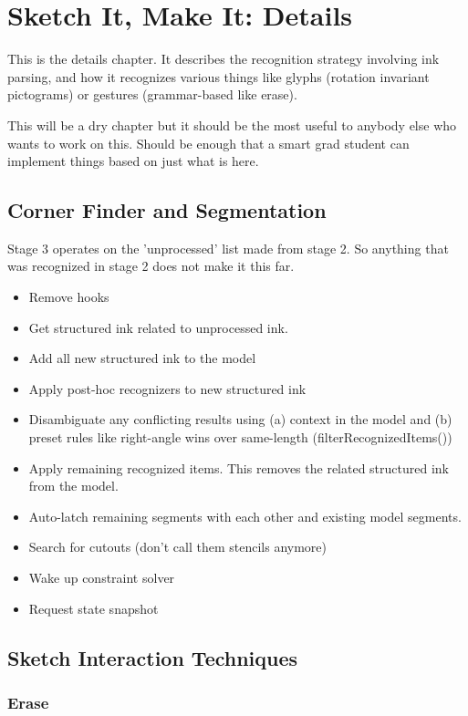 \chapter{Sketch It, Make It: Details}

This is the details chapter. It describes the recognition strategy
involving ink parsing, and how it recognizes various things like
glyphs (rotation invariant pictograms) or gestures (grammar-based like
erase).

This will be a dry chapter but it should be the most useful to anybody
else who wants to work on this. Should be enough that a smart grad
student can implement things based on just what is here.

\section{Corner Finder and Segmentation}
\label{sec:corner-finder}

Stage 3 operates on the 'unprocessed' list made from stage 2. So
anything that was recognized in stage 2 does not make it this far.

\begin{itemize}
\item Remove hooks
\item Get structured ink related to unprocessed ink.
\item Add all new structured ink to the model
\item Apply post-hoc recognizers to new structured ink
\item Disambiguate any conflicting results using (a) context in the
  model and (b) preset rules like right-angle wins over same-length
  (filterRecognizedItems())
\item Apply remaining recognized items. This removes the related
  structured ink from the model.
\item Auto-latch remaining segments with each other and existing model
  segments.
\item Search for cutouts (don't call them stencils anymore)
\item Wake up constraint solver
\item Request state snapshot
\end{itemize}

\section{Sketch Interaction Techniques}

\subsection{Erase}

